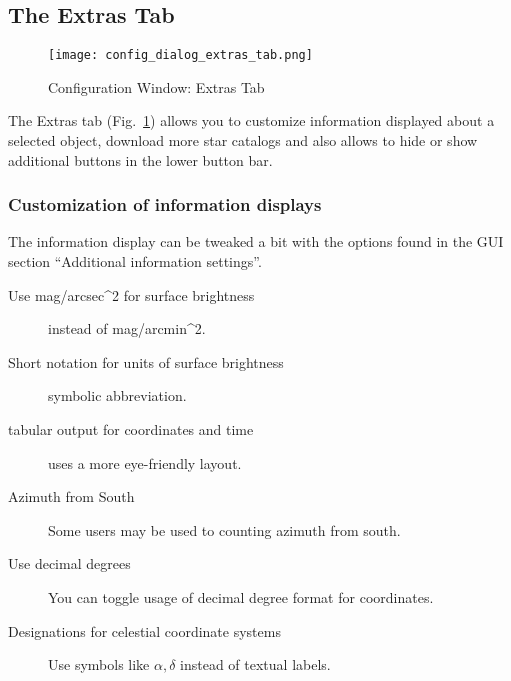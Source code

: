 \subsection{The Extras Tab}
\label{sec:gui:configuration:extras}

\begin{figure}[htbp]
\centering\texttt{[image: config\_dialog\_extras\_tab.png]}
\caption{Configuration Window: Extras Tab}
\label{fig:gui:configuration:extras}
\end{figure}

The Extras tab (Fig.~\ref{fig:gui:configuration:extras}) allows you to
customize information displayed about a selected object, download more
star catalogs and also allows to hide or show additional buttons in
the lower button bar. 

\subsubsection{Customization of information displays}
The information display can be tweaked a bit with the options found in the GUI section ``Additional information settings''.

\begin{description}
\item[Use mag/arcsec\^{}2 for surface brightness] instead of mag/arcmin\^{}2.
\item[Short notation for units of surface brightness] symbolic abbreviation.
\item[tabular output for coordinates and time] uses a more eye-friendly layout.
\item[Azimuth from South] Some users may be used to counting azimuth from south.
\item[Use decimal degrees] You can toggle usage of decimal degree format for coordinates.
\item[Designations for celestial coordinate systems] Use symbols like $\alpha, \delta$ instead of textual labels. 
\end{description}


